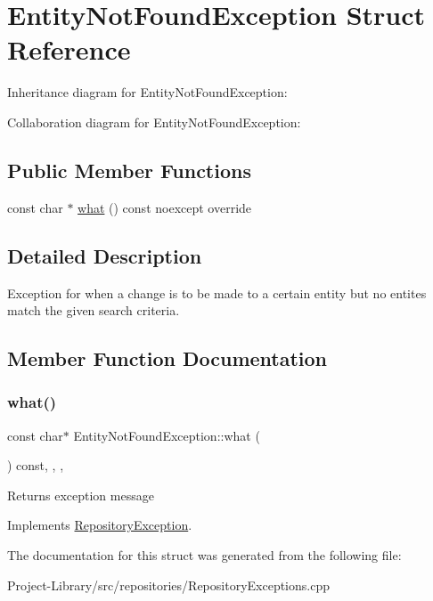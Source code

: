 \hypertarget{structEntityNotFoundException}{}\section{Entity\+Not\+Found\+Exception Struct Reference}
\label{structEntityNotFoundException}


Inheritance diagram for Entity\+Not\+Found\+Exception\+:


Collaboration diagram for Entity\+Not\+Found\+Exception\+:
\subsection*{Public Member Functions}
\begin{DoxyCompactItemize}
\item 
const char $\ast$ \hyperlink{structEntityNotFoundException_a888842b13906cd6356228422d4ac9477}{what} () const noexcept override
\end{DoxyCompactItemize}


\subsection{Detailed Description}
Exception for when a change is to be made to a certain entity but no entites match the given search criteria. 

\subsection{Member Function Documentation}
\mbox{\label{structEntityNotFoundException_a888842b13906cd6356228422d4ac9477}} 
\subsubsection{\texorpdfstring{what()}{what()}}
{\footnotesize\ttfamily const char$\ast$ Entity\+Not\+Found\+Exception\+::what (\begin{DoxyParamCaption}{ }\end{DoxyParamCaption}) const\hspace{0.3cm}{\ttfamily [inline]}, {\ttfamily [override]}, {\ttfamily [virtual]}, {\ttfamily [noexcept]}}

Returns exception message 

Implements \hyperlink{structRepositoryException_a6fdc5fe8fe6abdd205402d8648e5ccd4}{Repository\+Exception}.



The documentation for this struct was generated from the following file\+:\begin{DoxyCompactItemize}
\item 
Project-\/\+Library/src/repositories/Repository\+Exceptions.\+cpp\end{DoxyCompactItemize}
